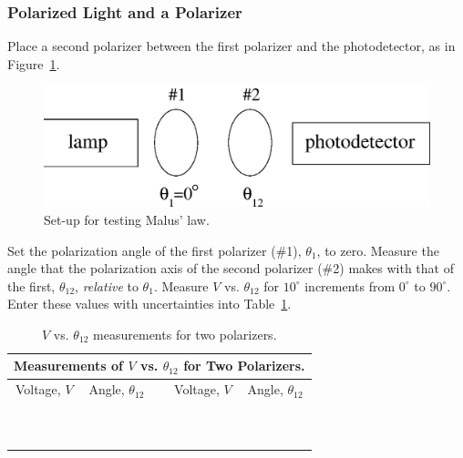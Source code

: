 \subsubsection{Polarized Light and a Polarizer}

Place a second polarizer between the first polarizer and the 
photodetector, as in Figure~\ref{fig:pol:twopol}. 
\begin{figure}[htb]
\centering 
\epsfxsize=8cm \includegraphics[scale=0.6]{7_polarization/twopol.eps}
\caption{Set-up for testing Malus' law.}
\label{fig:pol:twopol}
\end{figure}

\noindent Set the polarization angle of the first 
polarizer (\#1), $\theta_1$, to zero.  
Measure the angle that the polarization axis of the 
second polarizer (\#2) makes with that of the first, $\theta_{12}$, 
{\it relative} to $\theta_1$.  
Measure $V$ vs. $\theta_{12}$ for $10^\circ$ increments from $0^\circ$ to 
$90^\circ$.  
Enter these values with uncertainties into Table~\ref{tab:PO:2lens}.

\begin{table}[htb]
\begin{center}
\begin{tabular}{|c|c|c|c|c|}
\hline
\multicolumn{5}{|c|}{Measurements of $V$ vs. $\theta _{12}$ for
 Two Polarizers.} \\
\hline
Voltage, $V$ & Angle, $\theta _{12}$ & & Voltage, $V$ & Angle, $\theta _{12}$\\
\hline
\hspace*{3cm} & \hspace*{3cm} & \hspace*{.3cm} & \hspace*{3cm} & \hspace*{3cm}
\\
& & & & \\
\hline
& & & & \\
& & & & \\
\hline
& & & & \\
& & & & \\
\hline
& & & & \\
& & & & \\
\hline
& & & & \\
& & & & \\
\hline
\end{tabular}
\end{center}
\caption{$V$ vs. $\theta _{12}$ measurements for two polarizers.}
\label {tab:PO:2lens}
\end{table}



